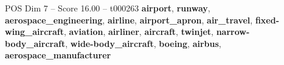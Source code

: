 \begin{textsample}{POS Dim 7 – Score 16.00 – t000263}  \label{ex:f7_pos_026}
\textbf{airport}, \textbf{runway}, \textbf{aerospace\_engineering}, \textbf{airline}, \textbf{airport\_apron}, \textbf{air\_travel}, \textbf{fixed-wing\_aircraft}, \textbf{aviation}, \textbf{airliner}, \textbf{aircraft}, \textbf{twinjet}, \textbf{narrow-body\_aircraft}, \textbf{wide-body\_aircraft}, \textbf{boeing}, \textbf{airbus}, \textbf{aerospace\_manufacturer}

\end{textsample}
